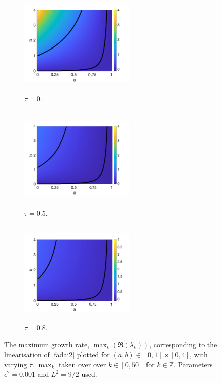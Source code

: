 \begin{figure}[H]
    \centering
    \begin{subfigure}[t]{0.32\textwidth}
        \centering
        \includegraphics[width=5.5cm,height = 5cm]{f1t0.png}
        \caption{$\tau=0$.}
        \label{}
    \end{subfigure}
    \hfill
    \begin{subfigure}[t]{0.32\textwidth}
        \centering
        \includegraphics[width=5.5cm,height = 5cm]{f2t05.png}
        \caption{$\tau=0.5$.}
        \label{}
    \end{subfigure}
    \hfill
    \begin{subfigure}[t]{0.32\textwidth}
        \centering
        \includegraphics[width=5.5cm,height = 5cm]{f2t08.png}
        \caption{$\tau=0.8$.}
        \label{}
    \end{subfigure}
    \caption{The maximum growth rate, $\max_k(\Re(\lambda_k))$, corresponding to the linearisation of \eqref{fadai2} plotted for $(a,b)\in[0,1]\times[0,4]$, with varying $\tau$. $\max_k$ taken over over $k\in[0,50]$ for $k\in\mathbb{Z}$. Parameters $\epsilon^2=0.001$ and $L^2=9/2$ used.}
    \label{fig:fad2}
\end{figure}
